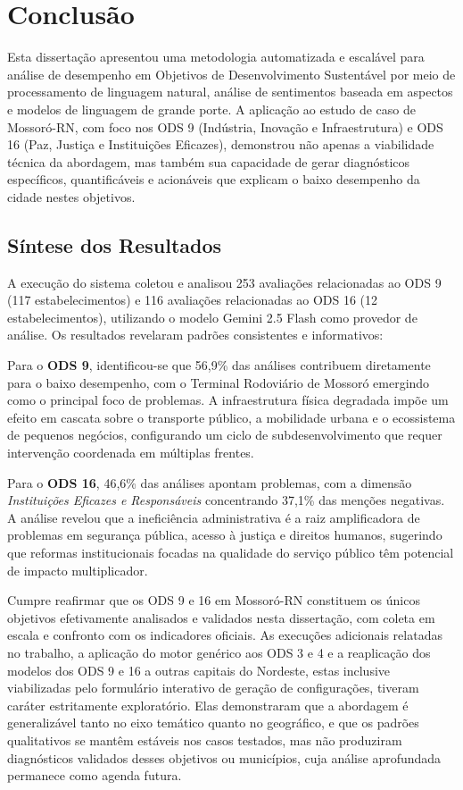 \chapter{Conclusão}
\label{cap:conclusao}

Esta dissertação apresentou uma metodologia automatizada e escalável para análise de desempenho em Objetivos de Desenvolvimento Sustentável por meio de processamento de linguagem natural, análise de sentimentos baseada em aspectos e modelos de linguagem de grande porte. A aplicação ao estudo de caso de Mossoró-RN, com foco nos ODS 9 (Indústria, Inovação e Infraestrutura) e ODS 16 (Paz, Justiça e Instituições Eficazes), demonstrou não apenas a viabilidade técnica da abordagem, mas também sua capacidade de gerar diagnósticos específicos, quantificáveis e acionáveis que explicam o baixo desempenho da cidade nestes objetivos.

\section{Síntese dos Resultados}
\label{sec:sintese}

A execução do sistema coletou e analisou 253 avaliações relacionadas ao ODS 9 (117 estabelecimentos) e 116 avaliações relacionadas ao ODS 16 (12 estabelecimentos), utilizando o modelo Gemini 2.5 Flash como provedor de análise. Os resultados revelaram padrões consistentes e informativos:

Para o \textbf{ODS 9}, identificou-se que 56,9\% das análises contribuem diretamente para o baixo desempenho, com o Terminal Rodoviário de Mossoró emergindo como o principal foco de problemas. A infraestrutura física degradada impõe um efeito em cascata sobre o transporte público, a mobilidade urbana e o ecossistema de pequenos negócios, configurando um ciclo de subdesenvolvimento que requer intervenção coordenada em múltiplas frentes.

Para o \textbf{ODS 16}, 46,6\% das análises apontam problemas, com a dimensão \textit{Instituições Eficazes e Responsáveis} concentrando 37,1\% das menções negativas. A análise revelou que a ineficiência administrativa é a raiz amplificadora de problemas em segurança pública, acesso à justiça e direitos humanos, sugerindo que reformas institucionais focadas na qualidade do serviço público têm potencial de impacto multiplicador.

Cumpre reafirmar que os ODS 9 e 16 em Mossoró-RN constituem os únicos objetivos efetivamente analisados e validados nesta dissertação, com coleta em escala e confronto com os indicadores oficiais. As execuções adicionais relatadas no trabalho, a aplicação do motor genérico aos ODS 3 e 4 e a reaplicação dos modelos dos ODS 9 e 16 a outras capitais do Nordeste, estas inclusive viabilizadas pelo formulário interativo de geração de configurações, tiveram caráter estritamente exploratório. Elas demonstraram que a abordagem é generalizável tanto no eixo temático quanto no geográfico, e que os padrões qualitativos se mantêm estáveis nos casos testados, mas não produziram diagnósticos validados desses objetivos ou municípios, cuja análise aprofundada permanece como agenda futura.

